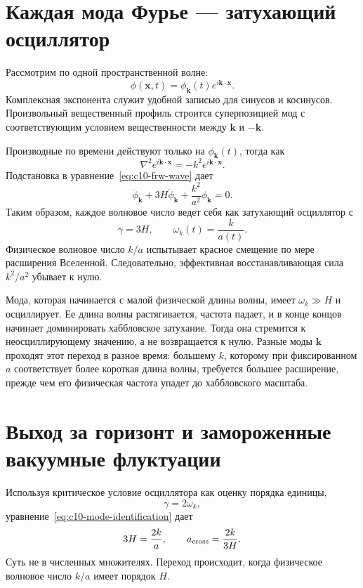 \section{Каждая мода Фурье — затухающий осциллятор}

Рассмотрим по одной пространственной волне:
\begin{equation}
\phi(\mathbf x,t)
=\phi_{\mathbf k}(t)e^{i\mathbf k\cdot\mathbf x}.
\label{eq:c10-mode-ansatz}
\end{equation}
Комплексная экспонента служит удобной записью для синусов и косинусов. Произвольный вещественный профиль строится суперпозицией мод с соответствующим условием вещественности между \(\mathbf k\) и \(-\mathbf k\).

Производные по времени действуют только на \(\phi_{\mathbf k}(t)\), тогда как
\[
\nabla^2e^{i\mathbf k\cdot\mathbf x}
=-k^2e^{i\mathbf k\cdot\mathbf x}.
\]
Подстановка в уравнение~\eqref{eq:c10-frw-wave} дает
\begin{equation}
\ddot\phi_{\mathbf k}
+3H\dot\phi_{\mathbf k}
+\frac{k^2}{a^2}\phi_{\mathbf k}=0.
\label{eq:c10-mode-equation}
\end{equation}
Таким образом, каждое волновое число ведет себя как затухающий осциллятор с
\begin{equation}
\gamma=3H,
\qquad
\omega_k(t)=\frac{k}{a(t)}.
\label{eq:c10-mode-identification}
\end{equation}
Физическое волновое число \(k/a\) испытывает красное смещение по мере расширения Вселенной. Следовательно, эффективная восстанавливающая сила \(k^2/a^2\) убывает к нулю.

Мода, которая начинается с малой физической длины волны, имеет \(\omega_k\gg H\) и осциллирует. Ее длина волны растягивается, частота падает, и в конце концов начинает доминировать хаббловское затухание. Тогда она стремится к неосциллирующему значению, а не возвращается к нулю. Разные моды \(\mathbf k\) проходят этот переход в разное время: большему \(k\), которому при фиксированном \(a\) соответствует более короткая длина волны, требуется большее расширение, прежде чем его физическая частота упадет до хаббловского масштаба.

\section{Выход за горизонт и замороженные вакуумные флуктуации}

Используя критическое условие осциллятора как оценку порядка единицы,
\[
\gamma=2\omega_k,
\]
уравнение~\eqref{eq:c10-mode-identification} дает
\begin{equation}
3H=\frac{2k}{a},
\qquad
a_{\rm cross}=\frac{2k}{3H}.
\label{eq:c10-critical-mode}
\end{equation}
Суть не в численных множителях. Переход происходит, когда физическое волновое число \(k/a\) имеет порядок \(H\).

